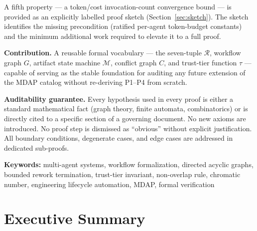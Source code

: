 \documentclass[12pt]{article}
\theoremstyle{definition}
\begin{document}
A fifth property --- a token/cost invocation-count convergence
bound --- is provided as an explicitly labelled proof sketch
(Section~\ref{sec:sketch}).
The sketch identifies the missing precondition (ratified per-agent
token-budget constants) and the minimum additional work required to
elevate it to a full proof.

\medskip
\noindent
\textbf{Contribution.}
A reusable formal vocabulary --- the seven-tuple $\mathcal{R}$,
workflow graph $G$, artifact state machine $\mathcal{M}$, conflict
graph $C$, and trust-tier function $\tau$ --- capable of serving as
the stable foundation for auditing any future extension of the MDAP
catalog without re-deriving P1--P4 from scratch.

\medskip
\noindent
\textbf{Auditability guarantee.}
Every hypothesis used in every proof is either a standard
mathematical fact (graph theory, finite automata, combinatorics) or
is directly cited to a specific section of a governing document.
No new axioms are introduced.
No proof step is dismissed as ``obvious'' without explicit
justification.
All boundary conditions, degenerate cases, and edge cases are
addressed in dedicated sub-proofs.

\bigskip
\noindent
\textbf{Keywords:}
multi-agent systems,
workflow formalization,
directed acyclic graphs,
bounded rework termination,
trust-tier invariant,
non-overlap rule,
chromatic number,
engineering lifecycle automation,
MDAP,
formal verification

\newpage

\section*{Executive Summary}
\end{document}
